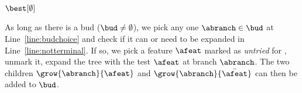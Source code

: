 \documentclass{article}
\begin{document}
\begin{algorithm}[t]
\begin{footnotesize}
{{			
			
		}
		}
		\Return $\best[\emptyset]$\;
	\end{footnotesize}
	\end{algorithm}


As long as there is a bud ($\bud \neq \emptyset$), we pick any one $\abranch \in \bud$ at Line~\ref{line:budchoice} and check if it can or need to be expanded in Line~\ref{line:notterminal}. %
If so, we pick a feature $\afeat$ marked as \emph{untried} for \abranch, unmark it, 
expand the tree with the test $\afeat$ at branch $\abranch$. The two children $\grow{\abranch}{\afeat}$ and $\grow{\abranch}{\bar{\afeat}}$ can then be added to $\bud$.
\end{document}
